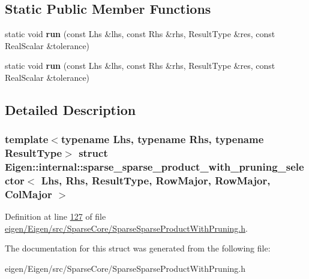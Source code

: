 \subsection*{Static Public Member Functions}
\begin{DoxyCompactItemize}
\item 
\mbox{\label{struct_eigen_1_1internal_1_1sparse__sparse__product__with__pruning__selector_3_01_lhs_00_01_rhs_e175d5ee5e029960308385b07451d28e_a0e7658cda3827eaa9daaf2344f6101f9}} 
static void {\bfseries run} (const Lhs \&lhs, const Rhs \&rhs, Result\+Type \&res, const Real\+Scalar \&tolerance)
\item 
\mbox{\label{struct_eigen_1_1internal_1_1sparse__sparse__product__with__pruning__selector_3_01_lhs_00_01_rhs_e175d5ee5e029960308385b07451d28e_a0e7658cda3827eaa9daaf2344f6101f9}} 
static void {\bfseries run} (const Lhs \&lhs, const Rhs \&rhs, Result\+Type \&res, const Real\+Scalar \&tolerance)
\end{DoxyCompactItemize}


\subsection{Detailed Description}
\subsubsection*{template$<$typename Lhs, typename Rhs, typename Result\+Type$>$\newline
struct Eigen\+::internal\+::sparse\+\_\+sparse\+\_\+product\+\_\+with\+\_\+pruning\+\_\+selector$<$ Lhs, Rhs, Result\+Type, Row\+Major, Row\+Major, Col\+Major $>$}



Definition at line \hyperlink{eigen_2_eigen_2src_2_sparse_core_2_sparse_sparse_product_with_pruning_8h_source_l00127}{127} of file \hyperlink{eigen_2_eigen_2src_2_sparse_core_2_sparse_sparse_product_with_pruning_8h_source}{eigen/\+Eigen/src/\+Sparse\+Core/\+Sparse\+Sparse\+Product\+With\+Pruning.\+h}.



The documentation for this struct was generated from the following file\+:\begin{DoxyCompactItemize}
\item 
eigen/\+Eigen/src/\+Sparse\+Core/\+Sparse\+Sparse\+Product\+With\+Pruning.\+h\end{DoxyCompactItemize}
